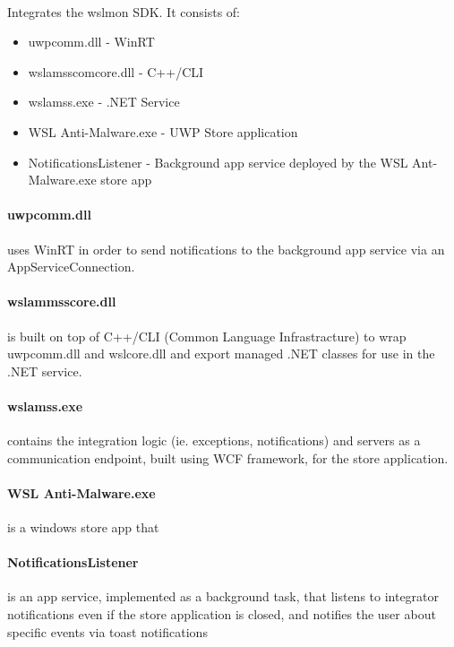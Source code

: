         \paragraph{}
        Integrates the wslmon SDK. It consists of:
        \begin{itemize}
            \item uwpcomm.dll - WinRT
            \item wslamsscomcore.dll - C++/CLI
            \item wslamss.exe - .NET Service
            \item WSL Anti-Malware.exe - UWP Store application
            \item NotificationsListener - Background app service deployed by the WSL Ant-Malware.exe store app
        \end{itemize}
        \paragraph{uwpcomm.dll} uses WinRT in order to send notifications to the background app service via an AppServiceConnection.
        \paragraph{wslammsscore.dll} is built on top of C++/CLI (Common Language Infrastracture) to wrap uwpcomm.dll and wslcore.dll and export managed .NET classes for use
        in the .NET service.
        \paragraph{wslamss.exe} contains the integration logic (ie. exceptions, notifications) and servers as a communication endpoint, built using WCF framework, for
        the store application.
        \paragraph{WSL Anti-Malware.exe}
        is a windows store app that 
        \paragraph{NotificationsListener} is an app service, implemented as a background task, that listens to integrator notifications even if the store application
        is closed, and notifies the user about specific events via toast notifications

